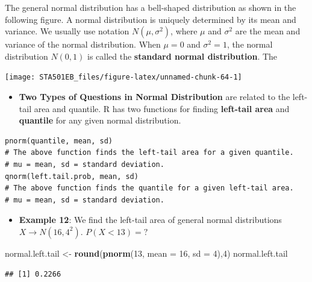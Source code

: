 \documentclass[
]{book}
\newenvironment{Shaded}{\begin{snugshade}}{\end{snugshade}}
\newcommand{\AttributeTok}[1]{\textcolor[rgb]{0.13,0.29,0.53}{#1}}
\newcommand{\DecValTok}[1]{\textcolor[rgb]{0.00,0.00,0.81}{#1}}
\newcommand{\FunctionTok}[1]{\textcolor[rgb]{0.13,0.29,0.53}{\textbf{#1}}}
\newcommand{\NormalTok}[1]{#1}
\newcommand{\OtherTok}[1]{\textcolor[rgb]{0.56,0.35,0.01}{#1}}
\providecommand{\tightlist}{%
  \setlength{\itemsep}{0pt}\setlength{\parskip}{0pt}}
\begin{document}
The general normal distribution has a bell-shaped distribution as shown in the following figure. A normal distribution is uniquely determined by its mean and variance. We usually use notation \(N(\mu, \sigma^2)\), where \(\mu\) and \(\sigma^2\) are the mean and variance of the normal distribution. When \(\mu=0\) and \(\sigma^2 =1\), the normal distribution \(N(0,1)\) is called the \textbf{standard normal distribution}. The

\begin{center}\texttt{[image: STA501EB\_files/figure-latex/unnamed-chunk-64-1]} \end{center}

\begin{itemize}
\tightlist
\item
  \textbf{Two Types of Questions in Normal Distribution} are related to the left-tail area and quantile. R has two functions for finding \textbf{left-tail area} and \textbf{quantile} for any given normal distribution.
\end{itemize}

\begin{verbatim}
pnorm(quantile, mean, sd)          
# The above function finds the left-tail area for a given quantile. 
# mu = mean, sd = standard deviation.
qnorm(left.tail.prob, mean, sd)    
# The above function finds the quantile for a given left-tail area.
# mu = mean, sd = standard deviation.
\end{verbatim}

\begin{itemize}
\tightlist
\item
  \textbf{Example 12}: We find the left-tail area of general normal distributions \(X \to N(16, 4^2)\). \(P(X < 13) = ?\)
\end{itemize}

\begin{Shaded}
\begin{Highlighting}[]
\NormalTok{normal.left.tail }\OtherTok{\textless{}{-}} \FunctionTok{round}\NormalTok{(}\FunctionTok{pnorm}\NormalTok{(}\DecValTok{13}\NormalTok{, }\AttributeTok{mean =} \DecValTok{16}\NormalTok{, }\AttributeTok{sd =} \DecValTok{4}\NormalTok{),}\DecValTok{4}\NormalTok{)}
\NormalTok{normal.left.tail}
\end{Highlighting}
\end{Shaded}

\begin{verbatim}
## [1] 0.2266
\end{verbatim}
\end{document}
